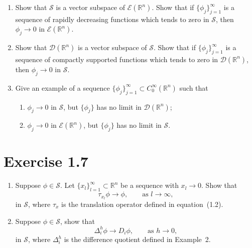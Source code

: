 \documentclass[12pt,a4paper]{article}
\theoremstyle{plain}
\theoremstyle{definition}
\theoremstyle{remark}
\theoremstyle{remark}
\begin{document}
\begin{enumerate}
	\item[(a)] Show that $\mathcal{S}$ is a vector subspace of
	$\mathcal{E}(\mathbb{R}^n)$.  Show that if
	$\{\phi_j\}_{j=1}^\infty$ is a sequence of rapidly
	decreasing functions which tends to zero in $\mathcal{S}$,
	then $\phi_j \to 0$ in $\mathcal{E}(\mathbb{R}^n)$.
	
	\item[(b)] Show that $\mathcal{D}(\mathbb{R}^n)$ is a vector subspace
	of $\mathcal{S}$.  Show that if $\{\phi_j\}_{j=1}^\infty$
	is a sequence of compactly supported functions which tends
	to zero in $\mathcal{D}(\mathbb{R}^n)$, then
	$\phi_j \to 0$ in $\mathcal{S}$.
	
	\item[(c)] Give an example of a sequence
	$\{\phi_j\}_{j=1}^\infty \subset C_0^\infty(\mathbb{R}^n)$
	such that
	\begin{enumerate}
		\item[(i)] $\phi_j \to 0$ in $\mathcal{S}$, but
		$\{\phi_j\}$ has no limit in
		$\mathcal{D}(\mathbb{R}^n)$;
		\item[(ii)] $\phi_j \to 0$ in $\mathcal{E}(\mathbb{R}^n)$,
		but $\{\phi_j\}$ has no limit in $\mathcal{S}$.
	\end{enumerate}
\end{enumerate}

\section*{Exercise 1.7}

\begin{enumerate}
	\item[(a)] Suppose $\phi\in\mathcal{S}$.  Let $\{x_l\}_{l=1}^\infty
	\subset\mathbb{R}^n$ be a sequence with $x_l\to 0$.
	Show that
	\[
	\tau_{x_l}\phi \to \phi, \qquad \text{as } l\to\infty,
	\]
	in $\mathcal{S}$, where $\tau_x$ is the translation
	operator defined in equation~(1.2).
	
	\item[(b)] Suppose $\phi\in\mathcal{S}$, show that
	\[
	\Delta_i^h \phi \to D_i\phi, \qquad \text{as } h\to 0,
	\]
	in $\mathcal{S}$, where $\Delta_i^h$ is the difference
	quotient defined in Example~2.
\end{enumerate}

\end{document}
